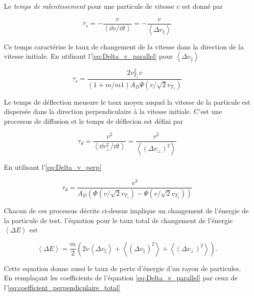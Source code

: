 \documentclass[main.tex]{subfiles}
\begin{document}
Le \textit{temps de ralentissement} pour une particule de vitesse \( v \) est donné par

\[
	\tau_s = - \frac{v}{\left\langle \dd v / \dd t \right\rangle} = - \frac{v}{\left\langle \Delta v_\parallel\right\rangle	}
\]

\noindent Ce temps caractérise le taux de changement de la vitesse dans la direction de la vitesse initiale.
En utilisant l'\autoref{eq:Delta_v_parallel} pour \( \left\langle \Delta v_\parallel\right\rangle	\)

\begin{equation}
	\tau_s = \frac{2 v_{T_1}^2 v}{\left( 1 + m/m1 \right) A_D \Psi \left( v / \sqrt{2} v_{T_1} \right)}
	\label{eq:temps_ralentissement}
\end{equation}

\noindent Le temps de déflection meusure le taux moyen auquel la vitesse de la particule est dispersée dans la direction perpendiculaire à la vitesse initiale.
C'est une processus de diffusion et le temps de déflecion est défini par

\[
	\tau_d = \frac{v^2}{\left\langle \dd v_\perp^2 / \dd t \right\rangle} = \frac{v^2}{\left\langle \left( \Delta v_\perp \right)^2 \right\rangle}
\]

\noindent En utilisant l'\autoref{eq:Delta_v_perp}

\begin{equation}
	\tau_d = \frac{v^3}{A_D \left( \Phi \left(v/\sqrt{2} v_{T_1} \right) - \Psi \left(v/\sqrt{2} v_{T_1} \right) \right)}
	\label{eq:temps_deflection}
\end{equation}

\noindent Chacun de ces processus décrits ci-dessus implique un changement de l'énergie de la particule de test. l'équation pour le taux total de changement de l'énergie \( \left\langle \Delta E \right\rangle \) est

\begin{equation}
	\left\langle \Delta E \right\rangle  = \frac{m}{2} \left( 2 v \left\langle \Delta v_\parallel \right\rangle + \left\langle \left( \Delta v_\parallel \right)^2 \right\rangle	 + \left\langle \left( \Delta v_\perp \right)^2 \right\rangle \right).
	\label{eq:Delta_energie}
\end{equation}

Cette equation donne aussi le taux de perte d'énergie d'un rayon de particules.
En remplaçant les coefficients de l'équation \ref{eq:Delta_v_parallel} par ceux de l'\autoref{eq:coefficient_perpendiculaire_total}
\end{document}
